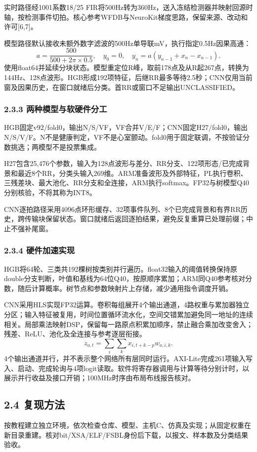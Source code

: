\documentclass[UTF8,12pt,a4paper]{ctexart}
\begin{document}
实时路径经1001系数18/25 FIR将500Hz转为360Hz，送入冻结检测器并映射回源时轴，按检测事件切拍。核心参考WFDB与NeuroKit梯度思路，保留来源、改动和许可[6,7]。

模型路径默认接收未额外数字滤波的500Hz单导联mV，执行指定0.5Hz因果高通：
\[
a=\frac{500}{500+2\pi\times0.5},\quad y_0=0,\quad
y_n=a(y_{n-1}+x_n-x_{n-1}).
\]
使用float64并延续分块状态。模型重定位R峰，取前178点及从R起267点，转换为144Hz、128点波形。HGB形成192项特征，后继RR最多等待2.5秒；CNN仅用当前窗及因果历史，在窗口就绪后分类。首RR或窗口不足输出UNCLASSIFIED。

\subsubsection{2.3.3 两种模型与软硬件分工}
HGB固定v92/fold0，输出N/S/VF，VF合并V/E/F；CNN固定H27/fold0，输出N/S/V/F。N不是健康判定，VF不是心室颤动。fold0用于固定联调，不按验证分数挑选；两模型不是投票集成。

H27包含25,476个参数，输入为128点波形与差分、RR分支、122项形态/已完成背景和最近8个RR，分类头输入269维。ARM准备波形及外部特征，PL执行卷积、三残差块、最大池化、RR分支和全连接，ARM执行softmax。FP32与树模型Q40分别核验，不将其称为INT8。

CNN逐拍路径采用4096点环形缓存、32项事件队列、8个已完成背景和有界RR历史，跨传输块保留状态。窗口就绪后返回逐拍结果，避免反复重算已处理前缀；中止不强补尾窗。

\subsubsection{2.3.4 硬件加速实现}
HGB将64轮、三类共192棵树按类别并行遍历。float32输入的阈值转换保持原double分支判断，叶值和基线为64位Q40，按原顺序累加；ARM同Q40参考核对分数，随后计算概率。树节点和参数映射片上存储，减少通用指令调度开销。

CNN采用HLS实现FP32运算。卷积每组展开4个输出通道，4路权重与累加器独立分区；输入特征被复用，时间位置循环流水化，空间交错累加避免同一地址的连续相关。局部乘法映射DSP，保留每一路原点积累加顺序，禁止融合乘加改变舍入；残差、ReLU、池化及全连接与参考逐层衔接。
\[
z_{o,t}=\sum_i\sum_k x_{i,t+k-p}w_{o,i,k}.
\]
4个输出通道并行，并不表示整个网络所有层同时运行。AXI-Lite完成261项输入写入、启动、完成轮询与4项logit读取。软件将寄存器调用与计算等待分别计时，以展示并行收益及接口开销；100MHz时序由布局布线报告核对。

\subsection{2.4 复现方法}
按教程建立独立环境，依次检查仓库、模型、主机C、仿真及实现；从固定权重在新目录重建。核对bit/XSA/ELF/FSBL身份后下载，以报文、样本数及分类结果验收。
\end{document}
